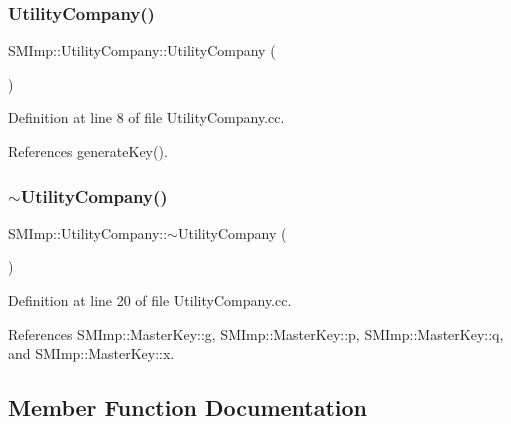 \subsubsection{\texorpdfstring{Utility\+Company()}{UtilityCompany()}\hspace{0.1cm}{\footnotesize\ttfamily [2/2]}}
{\footnotesize\ttfamily S\+M\+Imp\+::\+Utility\+Company\+::\+Utility\+Company (\begin{DoxyParamCaption}{ }\end{DoxyParamCaption})}



Definition at line 8 of file Utility\+Company.\+cc.



References generate\+Key().

\mbox{\label{classSMImp_1_1UtilityCompany_a9ef6bb1e7d8032eb305cb227cd68251d}} 
\subsubsection{\texorpdfstring{$\sim$\+Utility\+Company()}{~UtilityCompany()}}
{\footnotesize\ttfamily S\+M\+Imp\+::\+Utility\+Company\+::$\sim$\+Utility\+Company (\begin{DoxyParamCaption}{ }\end{DoxyParamCaption})}



Definition at line 20 of file Utility\+Company.\+cc.



References S\+M\+Imp\+::\+Master\+Key\+::g, S\+M\+Imp\+::\+Master\+Key\+::p, S\+M\+Imp\+::\+Master\+Key\+::q, and S\+M\+Imp\+::\+Master\+Key\+::x.



\subsection{Member Function Documentation}
\mbox{\label{classSMImp_1_1UtilityCompany_a9e6da1e8015a803748b644d186619a8f}} 
